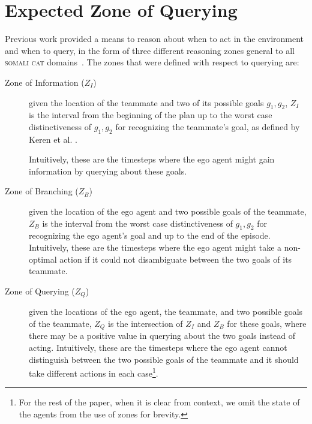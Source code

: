 \documentclass[letterpaper]{article}
\begin{document}
\section{Expected Zone of Querying}
Previous work provided a means to reason about when to act in the environment and when to query, in the form of three different reasoning zones general to all \textsc{somali cat} domains~\cite{mirskypenny}. The zones that were defined with respect to querying are: %
\begin{description}
\item [Zone of Information ($Z_I$)] given the location of the teammate and two of its possible goals $g_1,g_2$, $Z_I$ is the interval from the beginning of the plan up to the worst case distinctiveness of $g_1,g_2$ for recognizing the teammate's goal, as defined by Keren et al. .



Intuitively, these are the timesteps where the ego agent might gain information by querying about these goals.

\item [Zone of Branching ($Z_B$)] given the location of the ego agent and two possible goals of the teammate, $Z_B$ is the interval from the worst case distinctiveness of $g_1,g_2$ for recognizing the ego agent's goal and up to the end of the episode.
Intuitively, these are the timesteps where the ego agent might take a non-optimal action if it could not disambiguate between the two goals of its teammate.


\item [Zone of Querying ($Z_Q$)] given the locations of the ego agent, the teammate, and two possible goals of the teammate, $Z_Q$ is the intersection of $Z_I$ and $Z_B$ for these goals, where there may be a positive value in querying about the two goals instead of acting. Intuitively, these are the timesteps where the ego agent cannot distinguish between the two possible goals of the teammate and it should take different actions in each case\footnote{For the rest of the paper, when it is clear from context, we omit the state of the agents from the use of zones for brevity.}.
\end{description}
\end{document}
